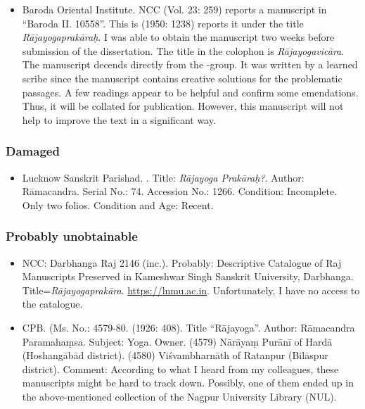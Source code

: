 \begin{itemize}
\item Baroda Oriental Institute. NCC (Vol. 23: 259) reports a manuscript in ``Baroda II. 10558''. This is  (1950: 1238) reports it under the title \textit{Rājayogaprakāraḥ}. I was able to obtain the manuscript two weeks before submission of the dissertation. The title in the colophon is \emph{Rājayogavicāra}. The manuscript decends directly from the \alpha-group. It was written by a learned scribe since the manuscript contains creative solutions for the problematic passages. A few readings appear to be helpful and confirm some emendations. Thus, it will be collated for publication. However, this manuscript will not help to improve the text in a significant way. %
\end{itemize}
  
\subsubsection{Damaged}
\begin{itemize}
\item Lucknow Sanskrit Parishad. . Title: \emph{Rājayoga Prakāraḥ?}. Author: Rāmacandra. Serial No.: 74. Accession No.: 1266. Condition: Incomplete. Only two folios. Condition and Age: Recent. 
\end{itemize}

\subsubsection{Probably unobtainable}
\begin{itemize}  
\item NCC: Darbhanga Raj 2146 (inc.). Probably: Descriptive Catalogue of Raj Manuscripts Preserved in Kameshwar Singh Sanskrit University, Darbhanga. Title=\emph{Rājayogaprakāra}. \url{https://lnmu.ac.in}. Unfortunately, I have no access to the catalogue.
\item CPB. (Ms. No.: 4579-80.  (1926: 408). Title ``Rājayoga''. Author: Rāmacandra Paramahaṃsa. Subject: Yoga. Owner. (4579) Nārāyaṃ Purānī of Hardā (Hoshangābād district). (4580) Viśvambharnāth of Ratanpur (Bilāspur district). Comment: According to what I heard from my colleagues, these manuscripts might be hard to track down. Possibly, one of them ended up in the above-mentioned collection of the Nagpur University Library (NUL). 
\end{itemize}
  
